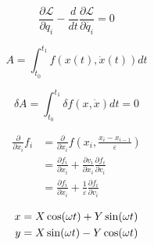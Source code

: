 $$
\frac{\partial \mathcal{L}}{\partial q_i} - \frac{d}{dt}\frac{\partial \mathcal{L}}{\partial \dot{q_i}} = 0
$$


$$ A = \int_{t_0}^{t_1} f(x(t), \dot{x}(t)) dt $$

$$
\delta A = \int_{t_0}^{t_1} \delta f(x, \dot{x})dt = 0
$$

\begin{align*}
    \frac{\partial}{\partial x_i} f_i &=
    \frac{\partial}{\partial x_i} f \left(x_i, \frac{x_i - x_{i-1}}{\varepsilon}\right) \\
    &= \frac{\partial f_i}{\partial x_i} + \frac{\partial v_i}{\partial x_i} \frac{\partial f_i}{\partial v_i} \\
    &= \frac{\partial f_i}{\partial x_i} + \frac{1}{\varepsilon} \frac{\partial f_i}{\partial v_i}
\end{align*}

\begin{align}
    x &= X \cos(\omega t) + Y \sin(\omega t) \notag \\
    y &= X \sin(\omega t) - Y \cos(\omega t) \label{eq:rotation}
\end{align}